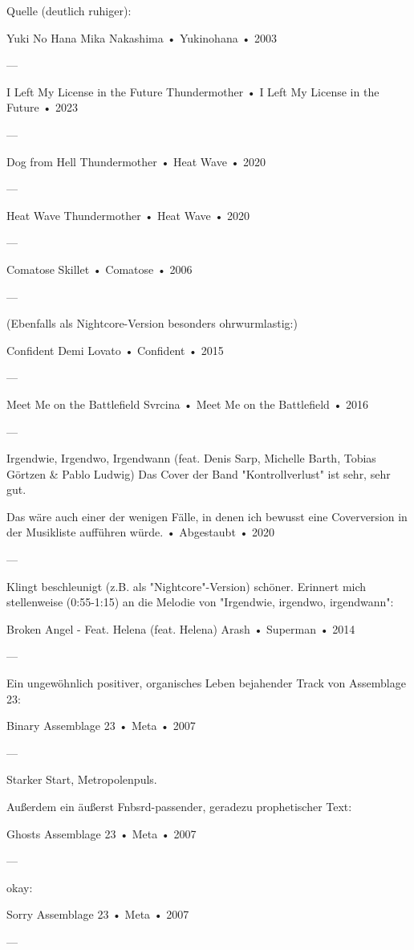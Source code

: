 Quelle (deutlich ruhiger):

Yuki No Hana
Mika Nakashima
 •
Yukinohana
 •
2003

—

I Left My License in the Future
Thundermother
 •
I Left My License in the Future
 •
2023

—

Dog from Hell
Thundermother
 •
Heat Wave
 • 2020

—

Heat Wave
Thundermother
 •
Heat Wave
 • 2020

—

Comatose
Skillet
 •
Comatose
 • 2006

—

(Ebenfalls als Nightcore-Version besonders ohrwurmlastig:)

Confident
Demi Lovato
 •
Confident
 • 2015

—

Meet Me on the Battlefield
Svrcina
 •
Meet Me on the Battlefield
 • 2016

—

Irgendwie, Irgendwo, Irgendwann (feat. Denis Sarp, Michelle Barth, Tobias Görtzen & Pablo Ludwig)
Das Cover der Band "Kontrollverlust" ist sehr, sehr gut.

Das wäre auch einer der wenigen Fälle, in denen ich bewusst eine Coverversion in der Musikliste aufführen würde.
 •
Abgestaubt
 • 2020

—

Klingt beschleunigt (z.B. als "Nightcore"-Version) schöner.
Erinnert mich stellenweise (0:55-1:15) an die Melodie von "Irgendwie, irgendwo, irgendwann":

Broken Angel - Feat. Helena (feat. Helena)
Arash
 •
Superman
 • 2014

—

Ein ungewöhnlich positiver, organisches Leben bejahender Track von Assemblage 23:

Binary
Assemblage 23
 •
Meta
 •
2007

—

Starker Start, Metropolenpuls.

Außerdem ein äußerst Fnbsrd-passender, geradezu prophetischer Text:

Ghosts
Assemblage 23
 •
Meta
 •
2007

—

okay:

Sorry
Assemblage 23
 •
Meta
 •
2007

—

